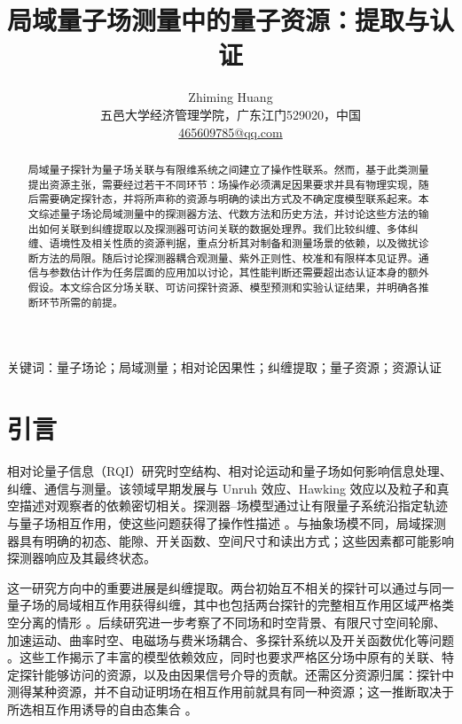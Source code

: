 \documentclass[UTF8,11pt,a4paper,fontset=none]{ctexart}
\title{局域量子场测量中的量子资源：提取与认证}
\author{Zhiming Huang\\\small 五邑大学经济管理学院，广东江门529020，中国\\\small \href{mailto:465609785@qq.com}{465609785@qq.com}}
\date{}
\begin{document}
\maketitle
\linenumbers
\begin{abstract}
局域量子探针为量子场关联与有限维系统之间建立了操作性联系。然而，基于此类测量提出资源主张，需要经过若干不同环节：场操作必须满足因果要求并具有物理实现，随后需要确定探针态，并将所声称的资源与明确的读出方式及不确定度模型联系起来。本文综述量子场论局域测量中的探测器方法、代数方法和历史方法，并讨论这些方法的输出如何关联到纠缠提取以及探测器可访问关联的数据处理界。我们比较纠缠、多体纠缠、语境性及相关性质的资源判据，重点分析其对制备和测量场景的依赖，以及微扰诊断方法的局限。随后讨论探测器耦合观测量、紫外正则性、校准和有限样本见证界。通信与参数估计作为任务层面的应用加以讨论，其性能判断还需要超出态认证本身的额外假设。本文综合区分场关联、可访问探针资源、模型预测和实验认证结果，并明确各推断环节所需的前提。
\end{abstract}
\noindent 关键词：量子场论；局域测量；相对论因果性；纠缠提取；量子资源；资源认证
\section{引言}
\label{sec:introduction}

相对论量子信息（RQI）研究时空结构、相对论运动和量子场如何影响信息处理、纠缠、通信与测量。该领域早期发展与 Unruh 效应、Hawking 效应以及粒子和真空描述对观察者的依赖密切相关。探测器--场模型通过让有限量子系统沿指定轨迹与量子场相互作用，使这些问题获得了操作性描述 \cite{PeresTerno2004,BirrellDavies1982,Wald1994,CrispinoHiguchiMatsas2008,HuLinLouko2012}。与抽象场模不同，局域探测器具有明确的初态、能隙、开关函数、空间尺寸和读出方式；这些因素都可能影响探测器响应及其最终状态。

这一研究方向中的重要进展是纠缠提取。两台初始互不相关的探针可以通过与同一量子场的局域相互作用获得纠缠，其中也包括两台探针的完整相互作用区域严格类空分离的情形 \cite{Reznik2003,ReznikRetzkerSilman2005,PozasKerstjens2015}。后续研究进一步考察了不同场和时空背景、有限尺寸空间轮廓、加速运动、曲率时空、电磁场与费米场耦合、多探针系统以及开关函数优化等问题 \cite{PozasKerstjensEM2016,Tjoa2021,Zambianco2024,Zambianco2026,MaesoGarcia2022,MoroteBalboaPerche2026,TeixidoBonfill2026,PercheGozzini2026}。这些工作揭示了丰富的模型依赖效应，同时也要求严格区分场中原有的关联、特定探针能够访问的资源，以及由因果信号介导的贡献。还需区分资源归属：探针中测得某种资源，并不自动证明场在相互作用前就具有同一种资源；这一推断取决于所选相互作用诱导的自由态集合 \cite{Nystrom2026Induced}。
\end{document}
